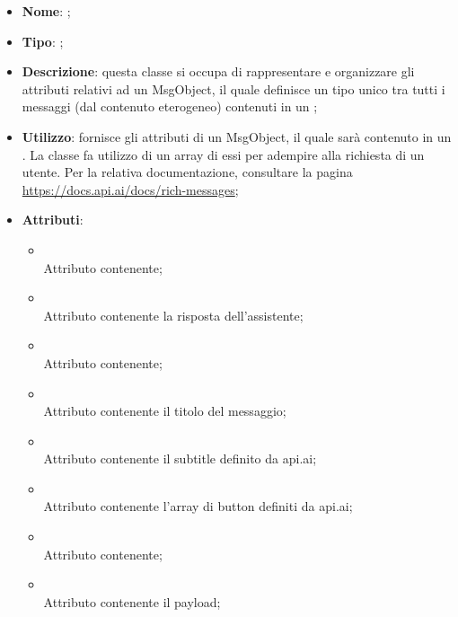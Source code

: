 \begin{itemize}
	\item \textbf{Nome}: ;
	\item \textbf{Tipo}: ;
	\item \textbf{Descrizione}: questa classe si occupa di rappresentare e organizzare gli attributi relativi ad un MsgObject, il quale definisce un tipo unico tra tutti i messaggi (dal contenuto eterogeneo) contenuti in un ;
	\item \textbf{Utilizzo}: fornisce gli attributi di un MsgObject, il quale sarà contenuto in un .
La classe  fa utilizzo di un array di essi per adempire alla richiesta di un utente.
Per la relativa documentazione, consultare la pagina \url{https://docs.api.ai/docs/rich-messages};
	\item \textbf{Attributi}:
	\begin{itemize}
		\item[]  \\
		Attributo contenente;
		\item[]  \\
		Attributo contenente la risposta dell'assistente;
		\item[]  \\
		Attributo contenente;
		\item[]  \\
		Attributo contenente il titolo del messaggio;
		\item[]  \\
		Attributo contenente il subtitle definito da api.ai;
		\item[]  \\
		Attributo contenente l'array di button definiti da api.ai;
		\item[]  \\
		Attributo contenente;
		\item[]  \\
		Attributo contenente il payload;
	\end{itemize}
\end{itemize}

